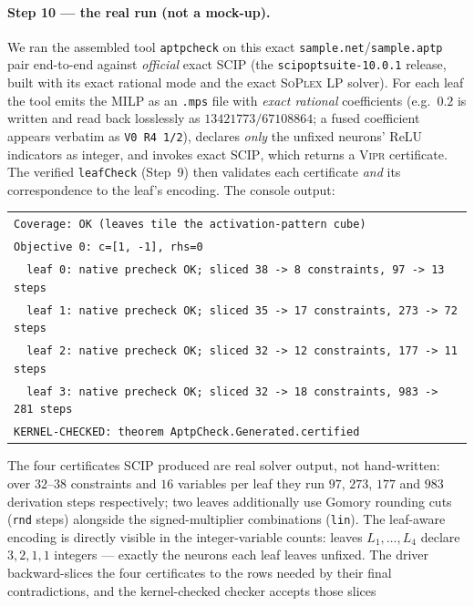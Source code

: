 \documentclass[runningheads]{llncs}
\newcommand{\leaf}{L}
\newcommand{\vipr}{\textsc{Vipr}}
\newcommand{\scip}{\textsc{SCIP}}
\newcommand{\code}[1]{\texttt{#1}}
\begin{document}
\paragraph{Step 10 --- the real run (not a mock-up).} We ran the assembled tool
\code{aptpcheck} on this exact \code{sample.net}/\code{sample.aptp} pair end-to-end
against \emph{official} exact \scip{} (the \code{scipoptsuite-10.0.1} release, built with
its exact rational mode and the exact \textsc{SoPlex} LP solver). For each leaf the tool
emits the MILP as an \code{.mps} file with \emph{exact rational} coefficients (e.g.\
$0.2$ is written and read back losslessly as $13421773/67108864$; a fused coefficient
appears verbatim as \code{V0 R4 1/2}), declares \emph{only} the unfixed neurons' ReLU
indicators as integer, and invokes exact \scip{}, which returns a \vipr{} certificate.
The verified \code{leafCheck} (Step~9) then validates each certificate \emph{and} its
correspondence to the leaf's encoding. The console output:
\begin{center}\small
\begin{tabular}{l}
\texttt{Coverage: OK (leaves tile the activation-pattern cube)}\\
\texttt{Objective 0: c=[1, -1], rhs=0}\\
\texttt{~~leaf 0: native precheck OK; sliced 38 -> 8 constraints, 97 -> 13 steps}\\
\texttt{~~leaf 1: native precheck OK; sliced 35 -> 17 constraints, 273 -> 72 steps}\\
\texttt{~~leaf 2: native precheck OK; sliced 32 -> 12 constraints, 177 -> 11 steps}\\
\texttt{~~leaf 3: native precheck OK; sliced 32 -> 18 constraints, 983 -> 281 steps}\\
\texttt{KERNEL-CHECKED: theorem AptpCheck.Generated.certified}\\
\end{tabular}
\end{center}
The four certificates \scip{} produced are real solver output, not hand-written: over
$32$--$38$ constraints and $16$ variables per leaf they run $97$, $273$, $177$ and $983$
derivation steps respectively; two leaves additionally use Gomory rounding cuts
(\code{rnd} steps) alongside the signed-multiplier combinations (\code{lin}). The
leaf-aware encoding is directly visible in the integer-variable counts: leaves
$\leaf_1,\dots,\leaf_4$ declare $3,2,1,1$ integers --- exactly the neurons each leaf
leaves unfixed. The driver backward-slices the four certificates to the rows needed
by their final contradictions, and the kernel-checked checker accepts those slices
\end{document}
